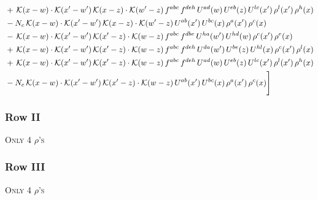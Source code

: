 \documentclass[9pt]{article}
\numberwithin{equation}{section}
\begin{document}
\begin{align}
&+\,\mathcal{K}(x-w)\cdot\mathcal{K}(x'-w')\,\mathcal{K}(x-z)\cdot\mathcal{K}(w'-z)\,f^{abc}\,f^{deh}\,U^{ad}(w)\,U^{eb}(z)\,U^{lc}(x')\,\rho^{l}(x')\,\rho^{h}(x)\notag\\
&-N_{c}\,\mathcal{K}(x-w)\cdot\mathcal{K}(x'-w')\,\mathcal{K}(x-z)\cdot\mathcal{K}(w'-z)\,U^{ab}(x')\,U^{bc}(x)\,\rho^{a}(x')\,\rho^{c}(x)\notag\\
&-\,\mathcal{K}(x-w)\cdot\mathcal{K}(x'-w')\,\mathcal{K}(x'-z)\cdot\mathcal{K}(w-z)\,f^{abc}\,f^{dbe}\,U^{ha}(w')\,U^{hd}(w)\,\rho^{c}(x')\,\rho^{e}(x)\notag\\
&+\,\mathcal{K}(x-w)\cdot\mathcal{K}(x'-w')\,\mathcal{K}(x'-z)\cdot\mathcal{K}(w-z)\,f^{abc}\,f^{deh}\,U^{da}(w')\,U^{be}(z)\,U^{hl}(x)\,\rho^{c}(x')\,\rho^{l}(x)\notag\\
&+\,\mathcal{K}(x-w)\cdot\mathcal{K}(x'-w')\,\mathcal{K}(x'-z)\cdot\mathcal{K}(w-z)\,f^{abc}\,f^{deh}\,U^{ad}(w)\,U^{eb}(z)\,U^{lc}(x')\,\rho^{l}(x')\,\rho^{h}(x)\notag\\
&-N_{c}\,\mathcal{K}(x-w)\cdot\mathcal{K}(x'-w')\,\mathcal{K}(x'-z)\cdot\mathcal{K}(w-z)\,U^{ab}(x')\,U^{bc}(x)\,\rho^{a}(x')\,\rho^{c}(x)\Bigg]
\end{align}     
\subsubsection{Row II}
\textsc{Only 4 $\rho$'s}
\subsubsection{Row III}
\textsc{Only 4 $\rho$'s}
\end{document}
